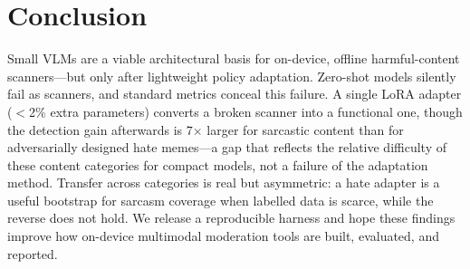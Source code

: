 \documentclass[sigconf,nonacm]{acmart}
\begin{document}
\section{Conclusion}
Small VLMs are a viable architectural basis for on-device, offline harmful-content
scanners---but only after lightweight policy adaptation. Zero-shot models silently fail as
scanners, and standard metrics conceal this failure. A single LoRA adapter ($<$2\% extra
parameters) converts a broken scanner into a functional one, though the detection gain
afterwards is 7$\times$ larger for sarcastic content than for adversarially designed hate
memes---a gap that reflects the relative difficulty of these content categories for compact
models, not a failure of the adaptation method. Transfer across categories is real but
asymmetric: a hate adapter is a useful bootstrap for sarcasm coverage when labelled data
is scarce, while the reverse does not hold. We release a reproducible harness and hope
these findings improve how on-device multimodal moderation tools are built, evaluated,
and reported.




\end{document}
